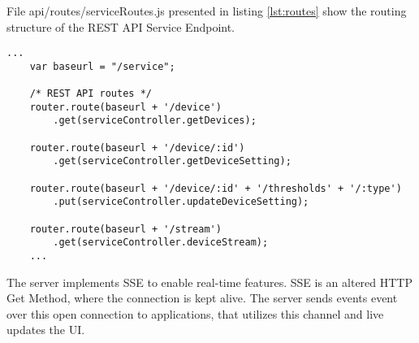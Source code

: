     File api/routes/serviceRoutes.js presented in listing \ref{lst:routes} show the routing structure of the REST API Service Endpoint. 

\begin{lstlisting}[style=js, caption=Node.js REST API Routes, label={lst:routes}]
    ...
    var baseurl = "/service";

    /* REST API routes */
    router.route(baseurl + '/device')
        .get(serviceController.getDevices);

    router.route(baseurl + '/device/:id')
        .get(serviceController.getDeviceSetting);

    router.route(baseurl + '/device/:id' + '/thresholds' + '/:type')
        .put(serviceController.updateDeviceSetting);

    router.route(baseurl + '/stream')
        .get(serviceController.deviceStream); 
    ...
\end{lstlisting}

The server implements SSE to enable real-time features. SSE is an altered HTTP Get Method, where the connection is kept alive. The server sends events event over this open connection to applications, that utilizes this channel and live updates the UI. 

